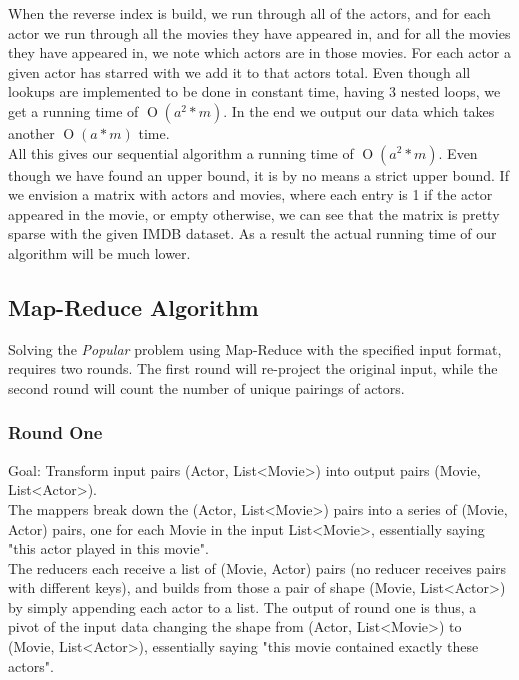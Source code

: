 \documentclass[a4paper,11pt]{article}
\newcommand{\BigO}[1]{\ensuremath{\operatorname{O}\left(#1\right)}}
\begin{document}
When the reverse index is build, we run through all of the actors, and for each actor we run through all the movies they have appeared in, and for all the movies they have appeared in, we note which actors are in those movies. For each actor a given actor has starred with we add it to that actors total. Even though all lookups are implemented to be done in constant time,  having 3 nested loops, we get a running time of \BigO{a^2*m}. In the end we output our data which takes another \BigO{a*m} time.\\

All this gives our sequential algorithm a running time of \BigO{a^2*m}. Even though we have found an upper bound, it is by no means a strict upper bound. If we envision a matrix with actors and movies, where each entry is 1 if the actor appeared in the movie, or empty otherwise, we can see that the matrix is pretty sparse with the given IMDB dataset. As a result the actual running time of our algorithm will be much lower.

\subsection{Map-Reduce Algorithm}
\label{sub:map-reduce}
Solving the \emph{Popular} problem using Map-Reduce with the specified input format, requires two rounds. The first round will re-project the original input, while the second round will count the number of unique pairings of actors.

\subsubsection{Round One}
Goal: Transform input pairs (Actor, List<Movie>) into output pairs (Movie, List<Actor>).\\

The mappers break down the (Actor, List<Movie>) pairs into a series of (Movie, Actor) pairs, one for each Movie in the input List<Movie>, essentially saying "this actor played in this movie".\\

The reducers each receive a list of (Movie, Actor) pairs (no reducer receives pairs with different keys), and builds from those a pair of shape (Movie, List<Actor>) by simply appending each actor to a list. The output of round one is thus, a pivot of the input data changing the shape from (Actor, List<Movie>) to (Movie, List<Actor>), essentially saying "this movie contained exactly these actors".
\end{document}
